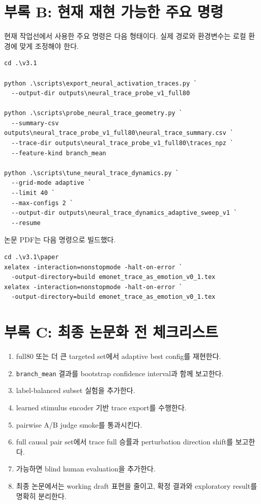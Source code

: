 \documentclass[11pt,a4paper]{article}
\begin{document}
\section{부록 B: 현재 재현 가능한 주요 명령}

현재 작업선에서 사용한 주요 명령은 다음 형태이다. 실제 경로와 환경변수는 로컬 환경에 맞게 조정해야 한다.

\begin{verbatim}
cd .\v3.1

python .\scripts\export_neural_activation_traces.py `
  --output-dir outputs\neural_trace_probe_v1_full80

python .\scripts\probe_neural_trace_geometry.py `
  --summary-csv outputs\neural_trace_probe_v1_full80\neural_trace_summary.csv `
  --trace-dir outputs\neural_trace_probe_v1_full80\traces_npz `
  --feature-kind branch_mean

python .\scripts\tune_neural_trace_dynamics.py `
  --grid-mode adaptive `
  --limit 40 `
  --max-configs 2 `
  --output-dir outputs\neural_trace_dynamics_adaptive_sweep_v1 `
  --resume
\end{verbatim}

논문 PDF는 다음 명령으로 빌드했다.

\begin{verbatim}
cd .\v3.1\paper
xelatex -interaction=nonstopmode -halt-on-error `
  -output-directory=build emonet_trace_as_emotion_v0_1.tex
xelatex -interaction=nonstopmode -halt-on-error `
  -output-directory=build emonet_trace_as_emotion_v0_1.tex
\end{verbatim}

\section{부록 C: 최종 논문화 전 체크리스트}

\begin{enumerate}
  \item full80 또는 더 큰 targeted set에서 adaptive best config를 재현한다.
  \item \texttt{branch\_mean} 결과를 bootstrap confidence interval과 함께 보고한다.
  \item label-balanced subset 실험을 추가한다.
  \item learned stimulus encoder 기반 trace export를 수행한다.
  \item pairwise A/B judge smoke를 통과시킨다.
  \item full causal pair set에서 trace full 승률과 perturbation direction shift를 보고한다.
  \item 가능하면 blind human evaluation을 추가한다.
  \item 최종 논문에서는 working draft 표현을 줄이고, 확정 결과와 exploratory result를 명확히 분리한다.
\end{enumerate}
\end{document}
